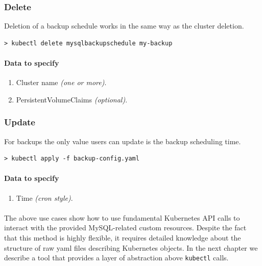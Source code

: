 \subsubsection*{Delete}

Deletion of a backup schedule works in the same way as the cluster deletion.

\begin{lstlisting}
> kubectl delete mysqlbackupschedule my-backup
\end{lstlisting}

\paragraph{Data to specify}
\begin{enumerate}
	\item Cluster name \textit{(one or more)}.
	\item PersistentVolumeClaims \textit{(optional)}.
\end{enumerate}

\subsubsection*{Update}

For backups the only value users can update is the backup
scheduling time.

\begin{lstlisting}
> kubectl apply -f backup-config.yaml
\end{lstlisting}

\paragraph{Data to specify}
\begin{enumerate}
    \item Time \textit{(cron style)}.
\end{enumerate}

\paragraph{}
The above use cases show how to use fundamental Kubernetes API calls to interact
with the provided MySQL-related custom resources. Despite the fact that this
method is highly flexible, it requires detailed knowledge about the structure of
raw yaml files describing Kubernetes objects. In the next chapter we describe
a tool that provides a layer of abstraction above \texttt{kubectl} calls.
